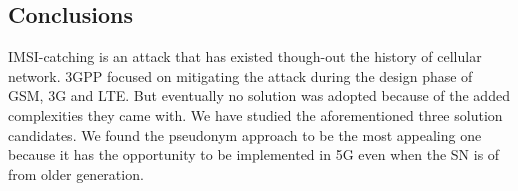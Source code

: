\documentclass[portrait,a0]{a0poster}
\begin{document}
\begin{multicols}{2}
\section{Conclusions}
IMSI-catching is an attack that has existed though-out the history of cellular network. 3GPP focused on mitigating the attack during the design phase of GSM, 3G and LTE. But eventually no solution was adopted because of the added complexities they came with.  We have studied the aforementioned three solution candidates. We found the pseudonym approach to be the most appealing one because it has the opportunity to be implemented in 5G even when the SN is of from older generation.




\end{multicols}

\vfill %

\begin{minipage}[t]{0.9\linewidth} %
\footnotesize
{}
\end{minipage}
\end{document}
